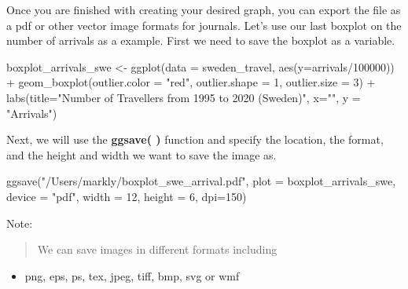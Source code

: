 \documentclass[
]{book}
\newenvironment{Shaded}{\begin{snugshade}}{\end{snugshade}}
\newcommand{\AttributeTok}[1]{\textcolor[rgb]{0.77,0.63,0.00}{#1}}
\newcommand{\DecValTok}[1]{\textcolor[rgb]{0.00,0.00,0.81}{#1}}
\newcommand{\FunctionTok}[1]{\textcolor[rgb]{0.00,0.00,0.00}{#1}}
\newcommand{\NormalTok}[1]{#1}
\newcommand{\OtherTok}[1]{\textcolor[rgb]{0.56,0.35,0.01}{#1}}
\newcommand{\SpecialCharTok}[1]{\textcolor[rgb]{0.00,0.00,0.00}{#1}}
\newcommand{\StringTok}[1]{\textcolor[rgb]{0.31,0.60,0.02}{#1}}
\providecommand{\tightlist}{%
  \setlength{\itemsep}{0pt}\setlength{\parskip}{0pt}}
\begin{document}
Once you are finished with creating your desired graph, you can export the file as a pdf or other vector image formats for journals. Let's use our last boxplot on the number of arrivals as a example. First we need to save the boxplot as a variable.

\begin{Shaded}
\begin{Highlighting}[]
\NormalTok{boxplot\_arrivals\_swe }\OtherTok{\textless{}{-}} \FunctionTok{ggplot}\NormalTok{(}\AttributeTok{data =}\NormalTok{ sweden\_travel, }\FunctionTok{aes}\NormalTok{(}\AttributeTok{y=}\NormalTok{arrivals}\SpecialCharTok{/}\DecValTok{100000}\NormalTok{)) }\SpecialCharTok{+} 
  \FunctionTok{geom\_boxplot}\NormalTok{(}\AttributeTok{outlier.color =} \StringTok{"red"}\NormalTok{, }\AttributeTok{outlier.shape =} \DecValTok{1}\NormalTok{, }\AttributeTok{outlier.size =} \DecValTok{3}\NormalTok{) }\SpecialCharTok{+}
  \FunctionTok{labs}\NormalTok{(}\AttributeTok{title=}\StringTok{"Number of Travellers from 1995 to 2020 (Sweden)"}\NormalTok{,}
       \AttributeTok{x=}\StringTok{""}\NormalTok{, }
       \AttributeTok{y =} \StringTok{"Arrivals"}\NormalTok{)}
\end{Highlighting}
\end{Shaded}

Next, we will use the \textbf{ggsave( )} function and specify the location, the format, and the height and width we want to save the image as.

\begin{Shaded}
\begin{Highlighting}[]
\FunctionTok{ggsave}\NormalTok{(}\StringTok{"/Users/markly/boxplot\_swe\_arrival.pdf"}\NormalTok{, }\AttributeTok{plot =}\NormalTok{ boxplot\_arrivals\_swe, }\AttributeTok{device =} \StringTok{"pdf"}\NormalTok{, }\AttributeTok{width =} \DecValTok{12}\NormalTok{, }\AttributeTok{height =} \DecValTok{6}\NormalTok{, }\AttributeTok{dpi=}\DecValTok{150}\NormalTok{)}
\end{Highlighting}
\end{Shaded}

Note:

\begin{quote}
We can save images in different formats including
\end{quote}

\begin{itemize}
\tightlist
\item
  png, eps, ps, tex, jpeg, tiff, bmp, svg or wmf
\end{itemize}
\end{document}

